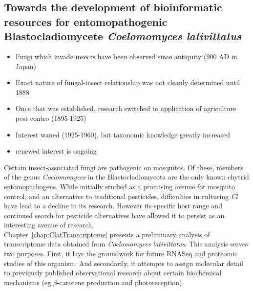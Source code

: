 \subsection{Towards the development of bioinformatic resources for entomopathogenic Blastocladiomycete \textit{Coelomomyces lativittatus}}
\begin{itemize}
  \item Fungi which invade insects have been observed since antiquity (900 AD in Japan)\\
  \item Exact nature of fungal-insect relationship was not cleanly determined until 1888\\
  \item Once that was established, research switched to application of agriculture pest contro (1895-1925)\\
  \item Interest waned (1925-1960), but taxonomic knowledge greatly increased
  \item renewed interest is ongoing
\end{itemize}
\indent Certain insect-associated fungi are pathogenic on mosquitos. Of these, members of the genus \textit{Coelomomyces} in the Blastocladiomycota are the only known chytrid entomopathogens. While initially studied as a promising avenue for mosquito control, and an alternative to traditional pesticides, difficulties in culturing \textit{Cl} have lead to a decline in its research. However its specific host range and continued search for pesticide alternatives have allowed it to persist as an interesting avenue of research.\\
\indent Chapter~\ref{chap:ClatTranscriptome} presents a preliminary analysis of transcriptome data obtained from \textit{Coelomomyces lativittatus}. This analysis serves two purposes. First, it lays the groundwork for future RNASeq and proteomic studies of this organism. And secondarily, it attempts to assign molecular detail to previously published observational research about certain biochemical mechanisms (eg $\beta$-carotene production and photoreception).\\
